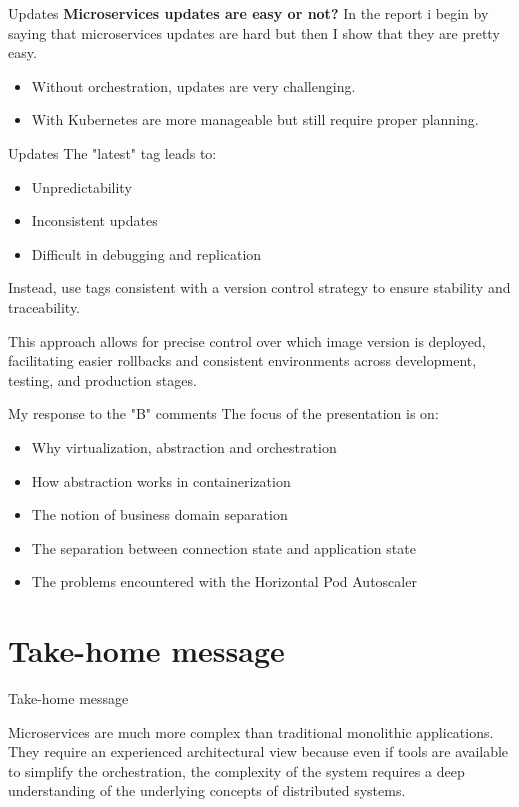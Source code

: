 \documentclass{beamer}
\begin{document}
\begin{frame}{Updates}
	\textbf{Microservices updates are easy or not?}
	In the report i begin by saying that microservices updates are hard but then I show that they are pretty easy.
	\begin{itemize}
		\item Without orchestration, updates are very challenging.
		\item With Kubernetes are more manageable but still require proper planning.
	\end{itemize}
\end{frame}
\begin{frame}{Updates}
	The "latest" tag leads to:
	\begin{itemize}
		\item Unpredictability
		\item Inconsistent updates
		\item Difficult in debugging and replication
	\end{itemize}
	\begin{block}{}
		Instead, use tags consistent with a version control strategy to ensure stability and traceability.
	\end{block}
	This approach allows for precise control over which image version is deployed, facilitating easier rollbacks and consistent environments across development, testing, and production stages.
\end{frame}

\begin{frame}{My response to the "B" comments}
		\label{index_2}
		The focus of the presentation is on:
			\begin{itemize}
				\item Why virtualization, abstraction and orchestration
				\item How abstraction works in containerization
				\item The notion of business domain separation
				\item The separation between connection state and application state
				\item The problems encountered with the Horizontal Pod Autoscaler
			\end{itemize}
\end{frame}

\section{Take-home message}
\begin{frame}{Take-home message}
	\begin{block}{}
		Microservices are much more complex than traditional monolithic applications. They require an experienced architectural view because even if tools are available to simplify the orchestration, the complexity of the system requires a deep understanding of the underlying concepts of distributed systems.
	\end{block}
\end{frame}
\end{document}
